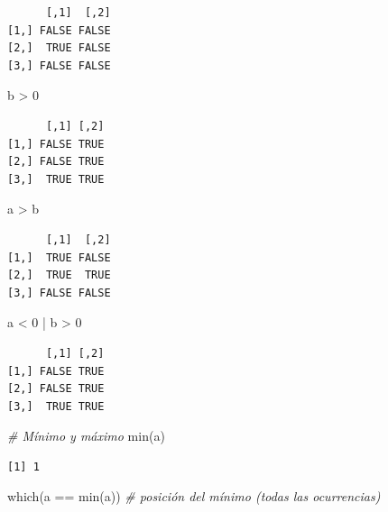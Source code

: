 \documentclass[
]{book}
\newenvironment{Shaded}{\begin{snugshade}}{\end{snugshade}}
\newcommand{\CommentTok}[1]{\textcolor[rgb]{0.56,0.35,0.01}{\textit{#1}}}
\newcommand{\DecValTok}[1]{\textcolor[rgb]{0.00,0.00,0.81}{#1}}
\newcommand{\FunctionTok}[1]{\textcolor[rgb]{0.00,0.00,0.00}{#1}}
\newcommand{\NormalTok}[1]{#1}
\newcommand{\SpecialCharTok}[1]{\textcolor[rgb]{0.00,0.00,0.00}{#1}}
\begin{document}
\begin{verbatim}
      [,1]  [,2]
[1,] FALSE FALSE
[2,]  TRUE FALSE
[3,] FALSE FALSE
\end{verbatim}

\begin{Shaded}
\begin{Highlighting}[]
\NormalTok{b }\SpecialCharTok{\textgreater{}} \DecValTok{0}
\end{Highlighting}
\end{Shaded}

\begin{verbatim}
      [,1] [,2]
[1,] FALSE TRUE
[2,] FALSE TRUE
[3,]  TRUE TRUE
\end{verbatim}

\begin{Shaded}
\begin{Highlighting}[]
\NormalTok{a }\SpecialCharTok{\textgreater{}}\NormalTok{ b}
\end{Highlighting}
\end{Shaded}

\begin{verbatim}
      [,1]  [,2]
[1,]  TRUE FALSE
[2,]  TRUE  TRUE
[3,] FALSE FALSE
\end{verbatim}

\begin{Shaded}
\begin{Highlighting}[]
\NormalTok{a }\SpecialCharTok{\textless{}} \DecValTok{0} \SpecialCharTok{|}\NormalTok{ b }\SpecialCharTok{\textgreater{}} \DecValTok{0}
\end{Highlighting}
\end{Shaded}

\begin{verbatim}
      [,1] [,2]
[1,] FALSE TRUE
[2,] FALSE TRUE
[3,]  TRUE TRUE
\end{verbatim}

\begin{Shaded}
\begin{Highlighting}[]
\CommentTok{\# Mínimo y máximo}
\FunctionTok{min}\NormalTok{(a)}
\end{Highlighting}
\end{Shaded}

\begin{verbatim}
[1] 1
\end{verbatim}

\begin{Shaded}
\begin{Highlighting}[]
\FunctionTok{which}\NormalTok{(a }\SpecialCharTok{==} \FunctionTok{min}\NormalTok{(a)) }\CommentTok{\# posición del mínimo (todas las ocurrencias)}
\end{Highlighting}
\end{Shaded}
\end{document}
